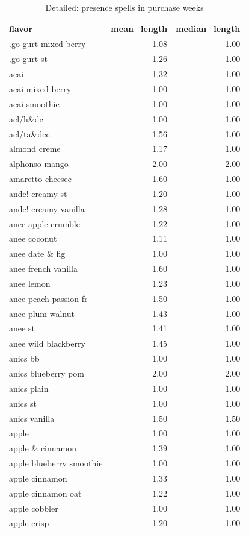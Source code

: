 \begin{table}
\caption{Detailed: presence spells in purchase weeks}
\begin{tabular}{lrr}
\toprule
flavor & mean\_length & median\_length \\
\midrule
.go-gurt mixed berry & 1.08 & 1.00 \\
.go-gurt st & 1.26 & 1.00 \\
acai & 1.32 & 1.00 \\
acai mixed berry & 1.00 & 1.00 \\
acai smoothie & 1.00 & 1.00 \\
acl/h\&dc & 1.00 & 1.00 \\
acl/ta\&dcc & 1.56 & 1.00 \\
almond creme & 1.17 & 1.00 \\
alphonso mango & 2.00 & 2.00 \\
amaretto cheesec & 1.60 & 1.00 \\
ande! creamy st & 1.20 & 1.00 \\
ande! creamy vanilla & 1.28 & 1.00 \\
anee apple crumble & 1.22 & 1.00 \\
anee coconut & 1.11 & 1.00 \\
anee date \& fig & 1.00 & 1.00 \\
anee french vanilla & 1.60 & 1.00 \\
anee lemon & 1.23 & 1.00 \\
anee peach passion fr & 1.50 & 1.00 \\
anee plum walnut & 1.43 & 1.00 \\
anee st & 1.41 & 1.00 \\
anee wild blackberry & 1.45 & 1.00 \\
anics bb & 1.00 & 1.00 \\
anics blueberry pom & 2.00 & 2.00 \\
anics plain & 1.00 & 1.00 \\
anics st & 1.00 & 1.00 \\
anics vanilla & 1.50 & 1.50 \\
apple & 1.00 & 1.00 \\
apple \& cinnamon & 1.39 & 1.00 \\
apple blueberry smoothie & 1.00 & 1.00 \\
apple cinnamon & 1.33 & 1.00 \\
apple cinnamon oat & 1.22 & 1.00 \\
apple cobbler & 1.00 & 1.00 \\
apple crisp & 1.20 & 1.00 \\

\end{tabular}
\end{table}
